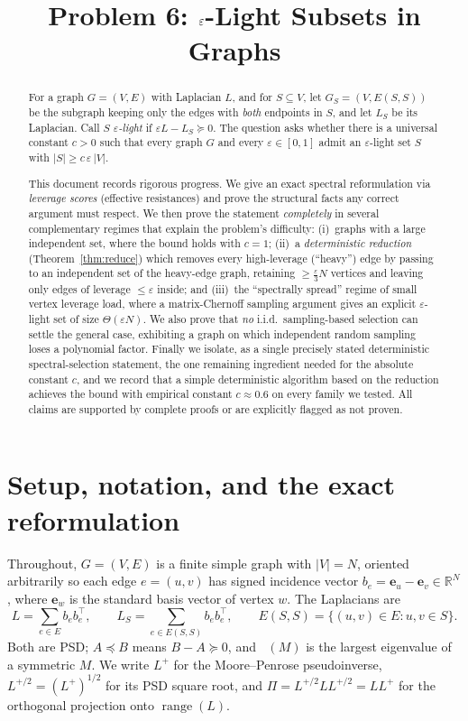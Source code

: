 \documentclass[12pt]{article}
\title{Problem 6: $\eps$-Light Subsets in Graphs}
\author{}
\date{}
\DeclareMathOperator{\range}{range}
\DeclareMathOperator*{\lammax}{\lambda_{\max}}
\newcommand{\bR}{\mathbb{R}}
\newcommand{\eps}{\varepsilon}
\theoremstyle{definition}
\begin{document}
\maketitle

\begin{abstract}
For a graph $G=(V,E)$ with Laplacian $L$, and for $S\subseteq V$, let
$G_S=(V,E(S,S))$ be the subgraph keeping only the edges with \emph{both}
endpoints in $S$, and let $L_S$ be its Laplacian. Call $S$ \emph{$\eps$-light}
if $\eps L-L_S\succeq 0$. The question asks whether there is a universal constant
$c>0$ such that every graph $G$ and every $\eps\in[0,1]$ admit an $\eps$-light
set $S$ with $|S|\ge c\,\eps\,|V|$.

This document records rigorous progress. We give an exact spectral
reformulation via \emph{leverage scores} (effective resistances) and prove the
structural facts any correct argument must respect. We then prove the statement
\emph{completely} in several complementary regimes that explain the problem's
difficulty: (i)~graphs with a large independent set, where the bound holds with
$c=1$; (ii)~a \emph{deterministic reduction} (Theorem~\ref{thm:reduce}) which
removes every high-leverage (``heavy'') edge by passing to an independent set of
the heavy-edge graph, retaining $\ge \tfrac{\eps}{3}N$ vertices and leaving only
edges of leverage $\le\eps$ inside; and (iii)~the ``spectrally spread'' regime of
small vertex leverage load, where a matrix-Chernoff sampling argument gives an
explicit $\eps$-light set of size $\Theta(\eps N)$. We also prove that \emph{no}
i.i.d.\ sampling-based selection can settle the general case, exhibiting a graph
on which independent random sampling loses a polynomial factor. Finally we isolate,
as a single precisely stated deterministic spectral-selection statement, the one
remaining ingredient needed for the absolute constant $c$, and we record that a
simple deterministic algorithm based on the reduction achieves the bound with
empirical constant $c\approx 0.6$ on every family we tested. All claims are
supported by complete proofs or are explicitly flagged as not proven.
\end{abstract}

\section{Setup, notation, and the exact reformulation}

Throughout, $G=(V,E)$ is a finite simple graph with $|V|=N$, oriented
arbitrarily so each edge $e=(u,v)$ has signed incidence vector
$b_e=\mathbf e_u-\mathbf e_v\in\bR^{N}$, where $\mathbf e_w$ is the standard
basis vector of vertex $w$. The Laplacians are
\[
  L=\sum_{e\in E}b_eb_e^{\top},
  \qquad
  L_S=\sum_{e\in E(S,S)}b_eb_e^{\top},
  \qquad E(S,S)=\{(u,v)\in E:u,v\in S\}.
\]
Both are PSD; $A\preceq B$ means $B-A\succeq0$, and $\lammax(M)$ is the largest
eigenvalue of a symmetric $M$. We write $L^{+}$ for the Moore--Penrose
pseudoinverse, $L^{+/2}=(L^{+})^{1/2}$ for its PSD square root, and
$\Pi=L^{+/2}LL^{+/2}=LL^{+}$ for the orthogonal projection onto $\range(L)$.
\end{document}
